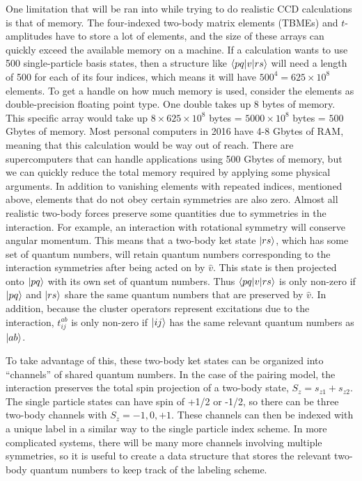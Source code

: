   One limitation that will be ran into while trying to do realistic
  CCD calculations is that of memory. The four-indexed two-body matrix elements (TBMEs) and
  $t$-amplitudes have to store a lot of elements, and the size of these
  arrays can quickly exceed the available memory on
  a machine. If a calculation wants to use 500 single-particle basis states, then
  a structure like $\braket{pq|v|rs}$ will need a  length of 500 for each of
  its four indices, which means it will have $500^4 = 625\times 10^8$
  elements. To get a handle on how much memory is used, consider the
  elements as double-precision floating point type. One double takes
  up 8 bytes of memory. This specific array would take up $8\times 625\times 10^8$ bytes
  = $5000 \times 10^8$ bytes = $500$ Gbytes of memory. Most personal
  computers in 2016 have 4-8 Gbytes of RAM, meaning that this calculation would
  be way out of reach. There are supercomputers that can handle
  applications using 500 Gbytes of memory, but we can quickly reduce
  the total memory required by applying some physical arguments. In
  addition to vanishing elements with repeated indices, mentioned
  above, elements that do not obey certain symmetries are also
  zero. Almost all realistic two-body forces preserve some quantities
  due to symmetries in the interaction. For example, an interaction
  with rotational symmetry will conserve angular momentum. This means
  that a two-body ket state $\ket{rs}$, which has some set of quantum
  numbers, will retain quantum numbers corresponding to the
  interaction symmetries after being acted on by $\hat{v}$. This state
  is then projected onto $\ket{pq}$ with its own set of quantum
  numbers. Thus $\braket{pq|v|rs}$ is only non-zero if $\ket{pq}$ and
  $\ket{rs}$ share the same quantum numbers that are preserved by
  $\hat{v}$. In addition, because the cluster operators represent
  excitations due to the interaction, $t_{ij}^{ab}$ is only non-zero
  if $\ket{ij}$ has the same relevant quantum numbers as $\ket{ab}$.

  To take advantage of this, these two-body ket states can be
  organized into ``channels'' of shared quantum numbers. In the case
  of the pairing model, the interaction preserves the total spin
  projection of a two-body state, $S_{z}=s_{z1}+s_{z2}$. The single
  particle states can have spin of +1/2 or -1/2, so there can be three
  two-body channels with $S_{z}=-1,0,+1$. These channels can then be
  indexed with a unique label in a similar way to the single particle
  index scheme. In more complicated systems, there will be many more
  channels involving multiple symmetries, so it is useful to create a
  data structure that stores the relevant two-body quantum numbers to
  keep track of the labeling scheme.

